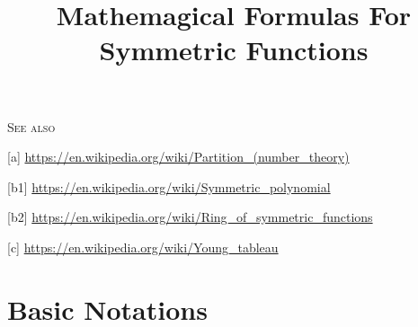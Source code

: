 \documentclass[12pt]{amsart}
\title{Mathemagical Formulas For Symmetric Functions}
\begin{document}
\maketitle
\thispagestyle{empty}

 \begin{center}
\thispagestyle{empty}
\renewcommand{\contentsname}{ \vspace{-180pt}\textsc{Contents}}   
\vspace{80pt}
  \tableofcontents
  
\vspace{200pt}
\renewcommand{\refname}{The Bibliography}   
\nocite{*}


\end{center}

\vspace{40pt}
\begin{center}\textsc{See also}\end{center}
[a]\label{part} \url{https://en.wikipedia.org/wiki/Partition_(number_theory)}

[b1]\label{symf} \url{https://en.wikipedia.org/wiki/Symmetric_polynomial}

[b2]\label{gen} \url{https://en.wikipedia.org/wiki/Ring_of_symmetric_functions}

[c]\label{tab} \url{https://en.wikipedia.org/wiki/Young_tableau}

\newpage
\section{Basic Notations}
\end{document}
